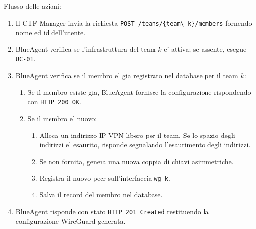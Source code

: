 Flusso delle azioni:

\begin{enumerate}
\def\labelenumi{\arabic{enumi}.}
\tightlist
\item
  Il CTF Manager invia la richiesta
  \passthrough{\lstinline!POST /teams/\{team\_k\}/members!} fornendo
  nome ed id dell'utente.
\item
  BlueAgent verifica se l'infrastruttura del team \(k\) e' attiva; se
  assente, esegue \passthrough{\lstinline!UC-01!}.
\item
  BlueAgent verifica se il membro e' gia registrato nel database per il
  team \(k\):

  \begin{enumerate}
  \def\labelenumii{\arabic{enumii}.}
  \tightlist
  \item
    Se il membro esiste gia, BlueAgent fornisce la configurazione
    rispondendo con \passthrough{\lstinline!HTTP 200 OK!}.
  \item
    Se il membro e' nuovo:

    \begin{enumerate}
    \def\labelenumiii{\arabic{enumiii}.}
    \tightlist
    \item
      Alloca un indirizzo IP VPN libero per il team. Se lo spazio degli
      indirizzi e' esaurito, risponde segnalando l'esaurimento degli
      indirizzi.
    \item
      Se non fornita, genera una nuova coppia di chiavi asimmetriche.
    \item
      Registra il nuovo peer sull'interfaccia
      \passthrough{\lstinline!wg-k!}.
    \item
      Salva il record del membro nel database.
    \end{enumerate}
  \end{enumerate}
\item
  BlueAgent risponde con stato
  \passthrough{\lstinline!HTTP 201 Created!} restituendo la
  configurazione WireGuard generata.
\end{enumerate}
